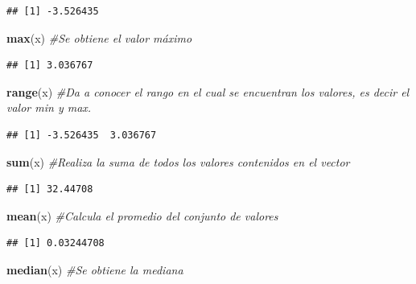 \documentclass[
]{book}
\newenvironment{Shaded}{\begin{snugshade}}{\end{snugshade}}
\newcommand{\CommentTok}[1]{\textcolor[rgb]{0.56,0.35,0.01}{\textit{#1}}}
\newcommand{\FunctionTok}[1]{\textcolor[rgb]{0.13,0.29,0.53}{\textbf{#1}}}
\newcommand{\NormalTok}[1]{#1}
\begin{document}
\begin{verbatim}
## [1] -3.526435
\end{verbatim}

\begin{Shaded}
\begin{Highlighting}[]
\FunctionTok{max}\NormalTok{(x) }\CommentTok{\#Se obtiene el valor máximo}
\end{Highlighting}
\end{Shaded}

\begin{verbatim}
## [1] 3.036767
\end{verbatim}

\begin{Shaded}
\begin{Highlighting}[]
\FunctionTok{range}\NormalTok{(x) }\CommentTok{\#Da a conocer el rango en el cual se encuentran los valores, es decir el valor min y max. }
\end{Highlighting}
\end{Shaded}

\begin{verbatim}
## [1] -3.526435  3.036767
\end{verbatim}

\begin{Shaded}
\begin{Highlighting}[]
\FunctionTok{sum}\NormalTok{(x) }\CommentTok{\#Realiza la suma de todos los valores contenidos en el vector }
\end{Highlighting}
\end{Shaded}

\begin{verbatim}
## [1] 32.44708
\end{verbatim}

\begin{Shaded}
\begin{Highlighting}[]
\FunctionTok{mean}\NormalTok{(x) }\CommentTok{\#Calcula el promedio del conjunto de valores }
\end{Highlighting}
\end{Shaded}

\begin{verbatim}
## [1] 0.03244708
\end{verbatim}

\begin{Shaded}
\begin{Highlighting}[]
\FunctionTok{median}\NormalTok{(x) }\CommentTok{\#Se obtiene la mediana }
\end{Highlighting}
\end{Shaded}
\end{document}
